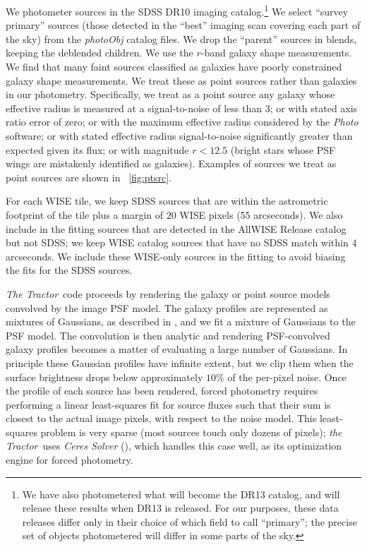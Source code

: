 \documentclass[12pt,preprint]{aastex}
\newcommand{\figref}[1]{\figurename~\ref{#1}}
\newcommand{\thetractor}{\textsl{the Tractor}}
\newcommand{\Thetractor}{\textsl{The Tractor}}
\begin{document}
We photometer sources in the SDSS DR10 imaging catalog.\footnote{We
  have also photometered what will become the DR13 catalog, and will
  release these results when DR13 is released.  For our purposes,
  these data releases differ only in their choice of which field to
  call ``primary''; the precise set of objects photometered will
  differ in some parts of the sky.}
%
We select ``survey primary'' sources (those detected in the ``best''
imaging scan covering each part of the sky) from the \emph{photoObj}
catalog files.  We drop the ``parent'' sources in blends, keeping the
deblended children.  We use the $r$-band galaxy shape measurements.
We find that many faint sources classified as galaxies have poorly
constrained galaxy shape measurements.  We treat these as point
sources rather than galaxies in our photometry.  Specifically, we
treat as a point source any galaxy whose effective radius is measured
at a signal-to-noise of less than 3; or with stated axis ratio error
of zero; or with the maximum effective radius considered by the
\emph{Photo} software; or with stated effective radius signal-to-noise
significantly greater than expected given its flux; or with magnitude
$r < 12.5$ (bright stars whose PSF wings are mistakenly identified as
galaxies).  Examples of sources we treat as point sources are shown in
\figref{fig:ptsrc}.


For each WISE tile, we keep SDSS sources that are within the astrometric
footprint of the tile plus
a margin of $20$ WISE pixels (55 arcseconds).  We also include in the
fitting sources that are detected in the AllWISE Release catalog but
not SDSS; we keep WISE catalog sources that have no SDSS match within
$4$ arcseconds.  We include these WISE-only sources in the fitting to
avoid biasing the fits for the SDSS sources.



\Thetractor\ code proceeds by rendering the galaxy or point source
models convolved by the image PSF model.  The galaxy profiles are
represented as mixtures of Gaussians, as described in
\citet{profiles}, and we fit a mixture of Gaussians to the PSF model.
The convolution is then analytic and rendering PSF-convolved galaxy
profiles becomes a matter of evaluating a large number of Gaussians.
In principle these Gaussian profiles have infinite extent, but we clip
them when the surface brightness drops below approximately $10\%$ of
the per-pixel noise.  Once the profile of each source has been
rendered, forced photometry requires performing a linear least-squares
fit for source fluxes such that their sum is closest to the actual
image pixels, with respect to the noise model.
This least-squares problem is very sparse (most sources touch only
dozens of pixels); \thetractor\ uses \emph{Ceres Solver}
(\citealt{agarwal}), which handles this case well, as its optimization
engine for forced photometry.
\end{document}
